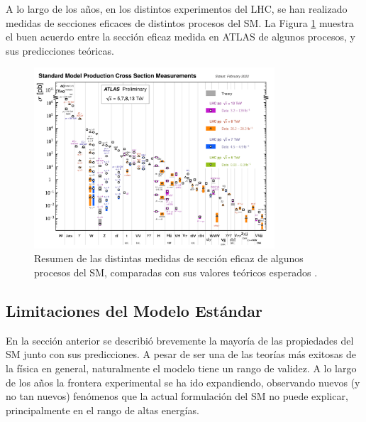 A lo largo de los años, en los distintos experimentos del LHC, se han realizado medidas de secciones eficaces de distintos procesos del SM. La Figura \ref{fig:sm_xs} muestra el buen acuerdo entre la sección eficaz medida en ATLAS de algunos procesos, y sus predicciones teóricas.

\begin{figure}
	\centering
  \includegraphics[width=0.8\textwidth]{images/theory/ATLAS_a_SMSummary_TotalXsect_3.pdf}
  \caption{Resumen de las distintas medidas de sección eficaz de algunos procesos del SM, comparadas con sus valores teóricos esperados \cite{ATL-PHYS-PUB-2022-009}.}
  \label{fig:sm_xs}
\end{figure}







\subsection{Limitaciones del Modelo Estándar}

En la sección anterior se describió brevemente la mayoría de las propiedades del SM junto con sus predicciones. A pesar de ser una de las teorías más exitosas de la 
física en general,
naturalmente el modelo tiene un rango de validez. A lo largo de los años la frontera experimental se ha ido expandiendo, observando nuevos (y no tan nuevos) fenómenos que la actual formulación del SM no puede explicar, principalmente en el rango de altas energías.

